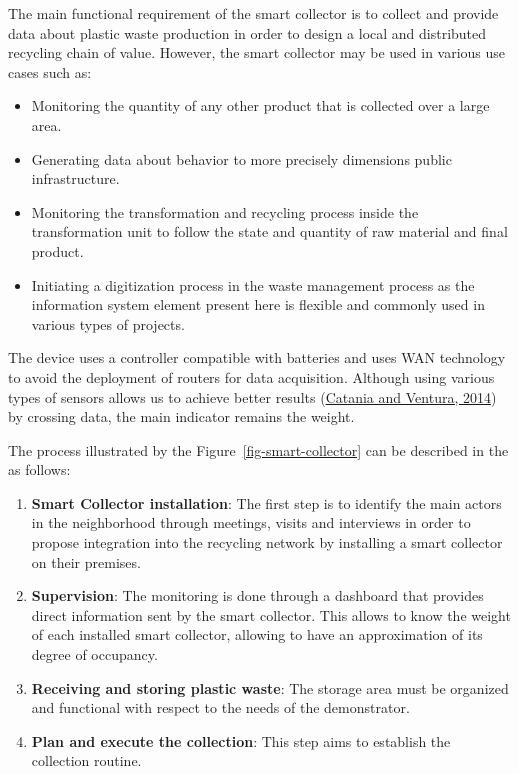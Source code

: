 \documentclass[
  11pt,
]{article}
\providecommand{\tightlist}{%
  \setlength{\itemsep}{0pt}\setlength{\parskip}{0pt}}\usepackage{longtable,booktabs,array}
\begin{document}
The main functional requirement of the smart collector is to collect and
provide data about plastic waste production in order to design a local
and distributed recycling chain of value. However, the smart collector
may be used in various use cases such as:

\begin{itemize}
\tightlist
\item
  Monitoring the quantity of any other product that is collected over a
  large area.\\
\item
  Generating data about behavior to more precisely dimensions public
  infrastructure.\\
\item
  Monitoring the transformation and recycling process inside the
  transformation unit to follow the state and quantity of raw material
  and final product.\\
\item
  Initiating a digitization process in the waste management process as
  the information system element present here is flexible and commonly
  used in various types of projects.
\end{itemize}

The device uses a controller compatible with batteries and uses WAN
technology to avoid the deployment of routers for data acquisition.
Although using various types of sensors allows us to achieve better
results (\protect\hyperlink{ref-Catania2014}{Catania and Ventura, 2014})
by crossing data, the main indicator remains the weight.

The process illustrated by the Figure~\ref{fig-smart-collector} can be
described in the as follows:

\begin{enumerate}
\def\labelenumi{\arabic{enumi}.}
\item
  \textbf{Smart Collector installation}: The first step is to identify
  the main actors in the neighborhood through meetings, visits and
  interviews in order to propose integration into the recycling network
  by installing a smart collector on their premises.
\item
  \textbf{Supervision}: The monitoring is done through a dashboard that
  provides direct information sent by the smart collector. This allows
  to know the weight of each installed smart collector, allowing to have
  an approximation of its degree of occupancy.
\item
  \textbf{Receiving and storing plastic waste}: The storage area must be
  organized and functional with respect to the needs of the
  demonstrator.
\item
  \textbf{Plan and execute the collection}: This step aims to establish
  the collection routine.
\end{enumerate}
\end{document}
